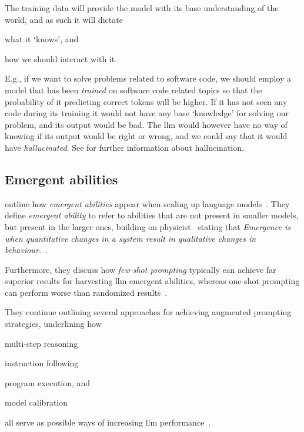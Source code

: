 The training data will provide the model with its base understanding of the
world, and as such it will dictate \begin{inparaenum}
    \item what it `knows', and
    \item how we should interact with it.
\end{inparaenum}
E.g., if we want to solve problems related to software code, we should employ a
model that has been \textit{trained} on software code related topics so that the
probability of it predicting correct tokens will be higher. If it has not seen
any code during its training it would not have any base `knowledge' for solving
our problem, and its output would be bad. The \acrshort{llm} would however have
no way of knowing if its output would be right or wrong, and we could say that
it would have \textit{hallucinated}.
See  for further information
about hallucination.


\subsection{Emergent abilities}\label{sec:emergentAbilities}

\citeauthor{emergentabilitiesLLM} outline how \textit{emergent abilities} appear
when scaling up language models~\cite[1]{emergentabilitiesLLM}. They define
\textit{emergent ability} to refer to abilities that are not present in smaller
models, but present in the larger ones\cite[1]{emergentabilitiesLLM}, building
on physicist~\citeauthor{anderson1972more} stating that \textit{Emergence is
    when quantitative changes in a system result in qualitative changes in
    behaviour.}~\cite[2]{emergentabilitiesLLM}.

Furthermore, they discuss how \textit{few-shot prompting} typically can achieve
far superior results for harvesting \acrshort{llm} emergent abilities, whereas
one-shot prompting can perform worse than randomized
results~\cite[3-4]{emergentabilitiesLLM}.

They continue outlining several approaches for achieving augmented prompting
strategies, underlining how \begin{inparaenum}
    \item multi-step reasoning
    \item instruction following
    \item program execution,
    and
    \item model calibration
\end{inparaenum}
all serve as possible ways of increasing \acrshort{llm} performance~\cite[5]{emergentabilitiesLLM}.

